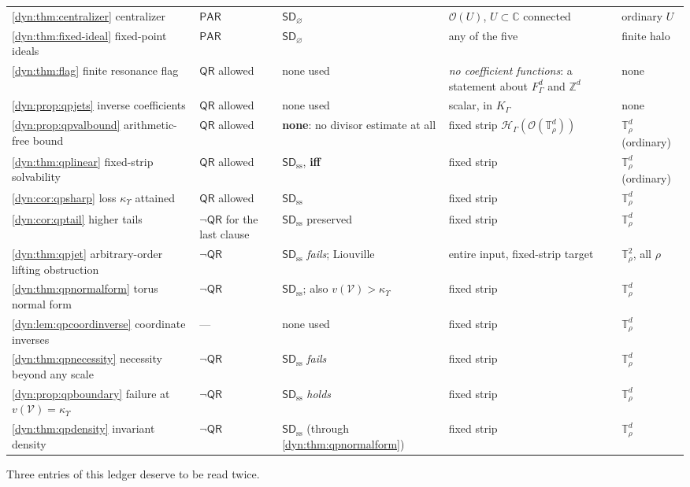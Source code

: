 \documentclass[11pt,letterpaper]{article}
\theoremstyle{definition}
\theoremstyle{remark}
\newcommand{\C}{\mathbb C}
\newcommand{\Z}{\mathbb Z}
\newcommand{\HH}{\mathscr H}
\newcommand{\OO}{\mathcal O}
\newcommand{\sdno}{\mathsf{SD}_{\varnothing}}
\newcommand{\pares}{\mathsf{PAR}}
\newcommand{\qres}{\mathsf{QR}}
\newcommand{\sdss}{\mathsf{SD}_{\mathrm{ss}}}
\newcommand{\TT}{\mathbb T}
\newcommand{\strip}{\OO(\TT^{d}_{\rho})}
\newcommand{\kups}{\kappa_{\Upsilon}}
\numberwithin{equation}{section}
\begin{document}
\begin{longtable}{@{}P{0.24\textwidth}P{0.10\textwidth}P{0.11\textwidth}P{0.22\textwidth}P{0.20\textwidth}@{}}
\cref{dyn:thm:centralizer} centralizer
& $\pares$ & $\sdno$ & $\OO(U)$, $U\subset\C$ connected & ordinary $U$\\
\cref{dyn:thm:fixed-ideal} fixed-point ideals
& $\pares$ & $\sdno$ & any of the five & finite halo\\
\cref{dyn:thm:flag} finite resonance flag
& $\qres$ allowed & none used & \emph{no coefficient functions}: a statement
about $F_\Gamma^{d}$ and $\Z^{d}$ & none\\
\cref{dyn:prop:qpjets} inverse coefficients
& $\qres$ allowed & none used & scalar, in $K_\Gamma$ & none\\
\cref{dyn:prop:qpvalbound} arithmetic-free bound
& $\qres$ allowed & \textbf{none}: no divisor estimate at all
& fixed strip $\HH_\Gamma(\strip)$ & $\TT^{d}_\rho$ (ordinary)\\
\cref{dyn:thm:qplinear} fixed-strip solvability
& $\qres$ allowed & $\sdss$, \textbf{iff} & fixed strip
& $\TT^{d}_\rho$ (ordinary)\\
\cref{dyn:cor:qpsharp} loss $\kups$ attained
& $\qres$ allowed & $\sdss$ & fixed strip & $\TT^{d}_\rho$\\
\cref{dyn:cor:qptail} higher tails
& $\lnot\qres$ for the last clause & $\sdss$ preserved & fixed strip
& $\TT^{d}_\rho$\\
\cref{dyn:thm:qpjet} arbitrary-order lifting obstruction
& $\lnot\qres$ & $\sdss$ \emph{fails}; Liouville & entire input, fixed-strip
target & $\TT^{2}_\rho$, all $\rho$\\
\cref{dyn:thm:qpnormalform} torus normal form
& $\lnot\qres$ & $\sdss$; also $v(\mathcal V)>\kups$ & fixed strip
& $\TT^{d}_\rho$\\
\cref{dyn:lem:qpcoordinverse} coordinate inverses
& --- & none used & fixed strip & $\TT^{d}_\rho$\\
\cref{dyn:thm:qpnecessity} necessity beyond any scale
& $\lnot\qres$ & $\sdss$ \emph{fails} & fixed strip & $\TT^{d}_\rho$\\
\cref{dyn:prop:qpboundary} failure at $v(\mathcal V)=\kups$
& $\lnot\qres$ & $\sdss$ \emph{holds} & fixed strip & $\TT^{d}_\rho$\\
\cref{dyn:thm:qpdensity} invariant density
& $\lnot\qres$ & $\sdss$ (through \cref{dyn:thm:qpnormalform})
& fixed strip & $\TT^{d}_\rho$\\
\bottomrule
\end{longtable}

\noindent Three entries of this ledger deserve to be read twice.
\end{document}
